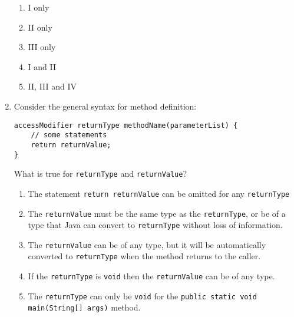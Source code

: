 \documentclass[CS180-S16-FinalExam.tex]{subfiles}
\begin{document}
\begin{enumerate}
\begin{enumerate}[I]
\end{enumerate}

\begin{enumerate}
\item I only
\item II only
\item III only
\item I and II \ifdraft \Ans \fi
\item II, III and IV
\end{enumerate}


\item  Consider the general syntax for method definition:
\begin{lstlisting}
accessModifier returnType methodName(parameterList) {
	// some statements
    return returnValue;
}
\end{lstlisting}
What is true for \texttt{returnType} and \texttt{returnValue}?
\begin{enumerate}
\item The statement \texttt{return returnValue} can be omitted for any \texttt{returnType}
\item The \texttt{returnValue} must be the same type as the \texttt{returnType}, or be of a type that Java can convert to \texttt{returnType} without loss of information. \ifdraft \Ans \fi
\item The \texttt{returnValue} can be of any type, but it will be automatically converted to \texttt{returnType} when the method returns to the caller. 
\item If the \texttt{returnType} is \texttt{void} then the \texttt{returnValue} can be of any type. 
\item The \texttt{returnType} can only be \texttt{void} for the \texttt{public static void main(String[] args)} method. 
\end{enumerate}


\end{enumerate}
\end{document}
